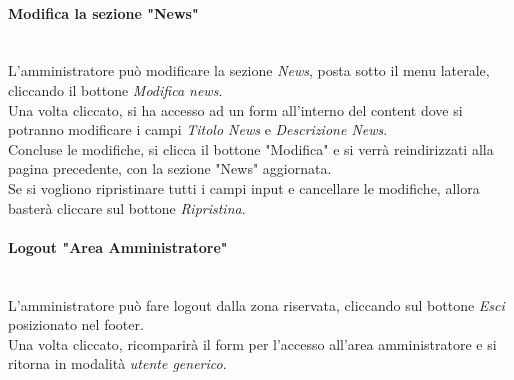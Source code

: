 \paragraph{Modifica la sezione "News"}\mbox{}\\
\label{par:ModN}
L'amministratore può modificare la sezione \emph{News}, posta sotto il menu laterale, cliccando il bottone \emph{Modifica news}.\\ 
Una volta cliccato, si ha accesso ad un form all'interno del content dove si potranno modificare i campi \emph{Titolo News} e \emph{Descrizione News}.\\
Concluse le modifiche, si clicca il bottone "Modifica" e si verrà reindirizzati alla pagina precedente, con la sezione "News" aggiornata.\\
Se si vogliono ripristinare tutti i campi input e cancellare le modifiche, allora basterà cliccare sul bottone \emph{Ripristina}.

\paragraph{Logout "Area Amministratore"}\mbox{}\\
\label{par:LogoutAA}
L'amministratore può fare logout dalla zona riservata, cliccando sul bottone \emph{Esci} posizionato nel footer.\\ 
Una volta cliccato, ricomparirà il form per l'accesso all'area amministratore e si ritorna in modalità \emph{utente generico}.\\